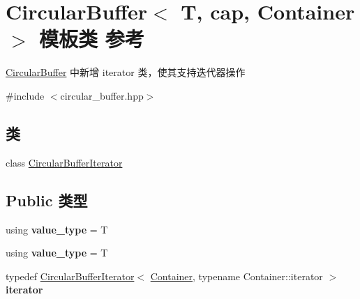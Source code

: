 \hypertarget{class_circular_buffer}{}\section{Circular\+Buffer$<$ T, cap, Container $>$ 模板类 参考}
\label{class_circular_buffer}


\mbox{\hyperlink{class_circular_buffer}{Circular\+Buffer}} 中新增 iterator 类，使其支持迭代器操作  




{\ttfamily \#include $<$circular\+\_\+buffer.\+hpp$>$}

\subsection*{类}
\begin{DoxyCompactItemize}
\item 
class \mbox{\hyperlink{class_circular_buffer_1_1_circular_buffer_iterator}{Circular\+Buffer\+Iterator}}
\end{DoxyCompactItemize}
\subsection*{Public 类型}
\begin{DoxyCompactItemize}
\item 
\mbox{\label{class_circular_buffer_ae63fd22da82f592a83eb8c04608a6bed}} 
using {\bfseries value\+\_\+type} = T
\item 
\mbox{\label{class_circular_buffer_ae63fd22da82f592a83eb8c04608a6bed}} 
using {\bfseries value\+\_\+type} = T
\item 
\mbox{\label{class_circular_buffer_a02d62302ded5e595e263c47e2b6067b3}} 
typedef \mbox{\hyperlink{class_circular_buffer_1_1_circular_buffer_iterator}{Circular\+Buffer\+Iterator}}$<$ \mbox{\hyperlink{class_container}{Container}}, typename Container\+::iterator $>$ {\bfseries iterator}
\end{DoxyCompactItemize}
